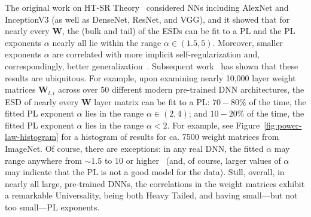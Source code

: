 The original work on HT-SR Theory~\cite{MM18_TR,MM19_HTSR_ICML} considered NNs including AlexNet and InceptionV3 (as well as DenseNet, ResNet, and VGG), and it showed that for nearly every $\mathbf{W}$, the (bulk and tail) of the ESDs can be fit to a PL and the PL exponents $\alpha$ nearly all lie within the range $\alpha\in(1.5,5)$.
Moreover, smaller exponents $\alpha$ are correlated with more implicit self-regularization and, correspondingly, better generalization~\cite{MM18_TR,MM19_HTSR_ICML}.
Subsequent work~\cite{MM18_unpub_work} has shown that these results are ubiquitous.
For example, 
upon examining nearly 10,000 layer weight matrices $\mathbf{W}_{l,i}$ across over 50 different modern pre-trained DNN architectures, the ESD of nearly every $\mathbf{W}$ layer matrix can be fit to a PL:
$70-80\%$ of the time, the fitted PL exponent $\alpha$ lies in the range $\alpha\in(2,4)$; and  %
$10-20\%$ of the time, the fitted PL exponent $\alpha$ lies in the range $\alpha< 2$.  %
For example, see Figure~\ref{fig:power-law-histogram} for a histogram of results for ca. 7500 weight matrices from ImageNet.
Of course, there are exceptions: in any real DNN, the fitted $\alpha$ may range anywhere from $\sim 1.5$ to $10$ or higher~\cite{MM18_unpub_work} (and, of course, larger values of $\alpha$ may indicate that the PL is not a good model for the data).  
Still, overall, in nearly all large, pre-trained DNNs, the correlations in the  weight matrices exhibit a remarkable Universality, being both Heavy Tailed, and having small---but not too small---PL exponents. 

